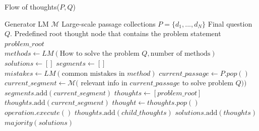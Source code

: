 \documentclass{article}
\begin{document}
\begin{algorithm}
    \caption{Flow of thoughts($P,Q$)}\label{alg:cap}
    \begin{algorithmic}
        \Require Generator LM $\mathcal{M}$
        \Require Large-scale passage collections $P=\{d_1, . . . , d_N \}$
        \Require Final question $Q$.
        \Require Predefined root thought node that contains the problem statement $problem\_root$
        \State $methods\gets LM(\text{How to solve the problem } Q, \text{number of methods})$
        \State $solutions\gets []$
            \State $segments \gets []$
            \State $mistakes\gets LM(\text{common mistakes in } method)$
                    \State $current\_passage\gets P.pop()$
                    \State $current\_segment\gets \mathcal{M}($ relevant info in $current\_passage$ to solve problem $Q))$
                    \State $segments.\text{add}(current\_segment)$
                \EndIf
            \EndWhile
            \State $thoughts\gets[problem\_root]$
                \State $thoughts.\text{add}(current\_segment)$
            \EndFor
                \State $thought\gets thoughts.pop()$
                    \State $operation.execute()$
                            \State $thoughts.\text{add}(child\_thoughts)$
                        \EndIf
                    \EndFor
                \EndFor
            \EndWhile
            \State $solutions.\text{add}(thoughts)$
        \EndFor
        \State \Return $majority(solutions)$

        
    \end{algorithmic}
    \end{algorithm}
\end{document}

